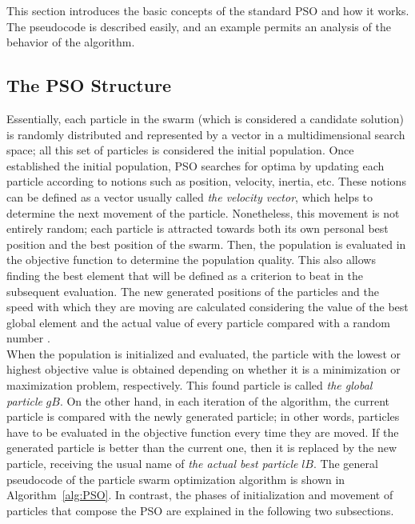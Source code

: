 This section introduces the basic concepts of the standard PSO and how it works. The pseudocode is described easily, and an example permits an analysis of the behavior of the algorithm.

\subsection{The PSO Structure}

Essentially, each particle in the swarm (which is considered a candidate solution) is randomly distributed and represented by a vector in a multidimensional search space; all this set of particles is considered the initial population. Once established the initial population, PSO searches for optima by updating each particle according to notions such as position, velocity, inertia, etc. These notions can be defined as a vector usually called \textit{the velocity vector}, which helps to determine the next movement of the particle. Nonetheless, this movement is not entirely random; each particle is attracted towards both its own personal best position and the best position of the swarm. Then, the population is evaluated in the objective function to determine the population quality. This also allows finding the best element that will be defined as a criterion to beat in the subsequent evaluation. The new generated positions of the particles and the speed with which they are moving are calculated considering the value of the best global element and the actual value of every particle compared with a random number \cite{erick2021matlab}.\\

When the population is initialized and evaluated, the particle with the lowest or highest objective value is obtained depending on whether it is a minimization or maximization problem, respectively. This found particle is called \textit{the global particle} $gB$. On the other hand, in each iteration of the algorithm, the current particle is compared with the newly generated particle; in other words, particles have to be evaluated in the objective function every time they are moved. If the generated particle is better than the current one, then it is replaced by the new particle, receiving the usual name of \textit{the actual best particle} $lB$. The general pseudocode of the particle swarm optimization algorithm is shown in Algorithm~\ref{alg:PSO}. In contrast, the phases of initialization and movement of particles that compose the PSO are explained in the following two subsections.\\

